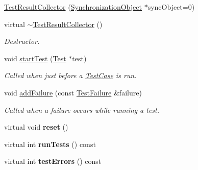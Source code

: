 \begin{DoxyCompactItemize}
\item 
\hyperlink{class_test_result_collector_a8bc475c91000fca9f0ed34e105577767}{Test\+Result\+Collector} (\hyperlink{class_synchronized_object_1_1_synchronization_object}{Synchronization\+Object} $\ast$sync\+Object=0)
\item 
\hypertarget{class_test_result_collector_a2e905ace0bcb819bbe190faf16ea1aed}{virtual \hyperlink{class_test_result_collector_a2e905ace0bcb819bbe190faf16ea1aed}{$\sim$\+Test\+Result\+Collector} ()}\label{class_test_result_collector_a2e905ace0bcb819bbe190faf16ea1aed}

\begin{DoxyCompactList}\small\item\em Destructor. \end{DoxyCompactList}\item 
\hypertarget{class_test_result_collector_a647d3e05ffc8fcf7023fea2f7c9f95cb}{void \hyperlink{class_test_result_collector_a647d3e05ffc8fcf7023fea2f7c9f95cb}{start\+Test} (\hyperlink{class_test}{Test} $\ast$test)}\label{class_test_result_collector_a647d3e05ffc8fcf7023fea2f7c9f95cb}

\begin{DoxyCompactList}\small\item\em Called when just before a \hyperlink{class_test_case}{Test\+Case} is run. \end{DoxyCompactList}\item 
void \hyperlink{class_test_result_collector_af53cbc55621f0eb0dc02d8b0203ea321}{add\+Failure} (const \hyperlink{class_test_failure}{Test\+Failure} \&failure)
\begin{DoxyCompactList}\small\item\em Called when a failure occurs while running a test. \end{DoxyCompactList}\item 
\hypertarget{class_test_result_collector_a1e20981cc1e127942154a643639d4740}{virtual void {\bfseries reset} ()}\label{class_test_result_collector_a1e20981cc1e127942154a643639d4740}

\item 
\hypertarget{class_test_result_collector_ac832652158423deae9c2815ba616e836}{virtual int {\bfseries run\+Tests} () const }\label{class_test_result_collector_ac832652158423deae9c2815ba616e836}

\item 
\hypertarget{class_test_result_collector_a0dc4aa03e6b22907cd44cf30a9ea0af3}{virtual int {\bfseries test\+Errors} () const }\label{class_test_result_collector_a0dc4aa03e6b22907cd44cf30a9ea0af3}


\end{DoxyCompactItemize}
